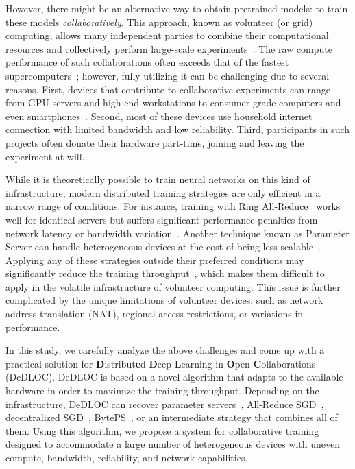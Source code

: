 However, there might be an alternative way to obtain pretrained models: to train these models \emph{collaboratively}. This approach, known as volunteer (or grid) computing, allows many independent parties to combine their computational resources and collectively perform large-scale experiments~\cite{seti_at_home,foldingathome,anderson2004boinc}. The raw compute performance of such collaborations often exceeds that of the fastest supercomputers~\cite{folding_exaflop_2}; however, fully utilizing it can be challenging due to several reasons. First, devices that contribute to collaborative experiments can range from GPU servers and high-end workstations to consumer-grade computers and even smartphones~\cite{Tapparello2016VolunteerCO}. Second, most of these devices use household internet connection with limited bandwidth and low reliability. Third, participants in such projects often donate their hardware part-time, joining and leaving the experiment at will.

While it is theoretically possible to train neural networks on this kind of infrastructure, modern distributed training strategies are only efficient in a narrow range of conditions. For instance, training with Ring All-Reduce~\cite{ringallreduce} works well for identical servers but suffers significant performance penalties from network latency or bandwidth variation~\cite{wagma}. Another technique known as Parameter Server can handle heterogeneous devices at the cost of being less scalable~\cite{ps}. Applying any of these strategies outside their preferred conditions may significantly reduce the training throughput~\cite{shi2018performance}, which makes them difficult to apply in the volatile infrastructure of volunteer computing. This issue is further complicated by the unique limitations of volunteer devices, such as network address translation (NAT), regional access restrictions, or variations in performance.

In this study, we carefully analyze the above challenges and come up with a practical solution for \textbf{D}istribut\textbf{e}d \textbf{D}eep \textbf{L}earning in \textbf{O}pen \textbf{C}ollaborations (DeDLOC). DeDLOC is based on a novel algorithm that adapts to the available hardware in order to maximize the training throughput. Depending on the infrastructure, DeDLOC can recover parameter servers~\cite{ps}, All-Reduce SGD~\cite{sergeev2018horovod}, decentralized SGD~\cite{dp_sgd}, BytePS~\cite{byteps}, or an intermediate strategy that combines all of them. Using this algorithm, we propose a system for collaborative training designed to accommodate a large number of heterogeneous devices with uneven compute, bandwidth, reliability, and network capabilities.

